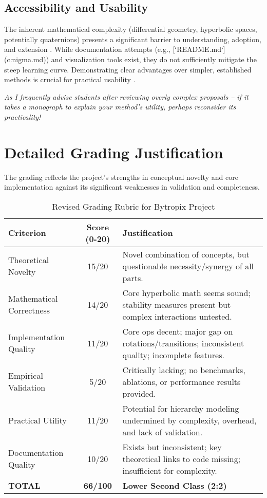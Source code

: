 \documentclass[11pt]{article}
\begin{document}
\subsection{Accessibility and Usability}

The inherent mathematical complexity (differential geometry, hyperbolic spaces, potentially quaternions) presents a significant barrier to understanding, adoption, and extension \cite{BronsteinEtAl2021}. While documentation attempts (e.g., [`README.md`](c:\Users\3nigma\source\repos\bytropix\README.md)) and visualization tools exist, they do not sufficiently mitigate the steep learning curve. Demonstrating clear advantages over simpler, established methods is crucial for practical usability \cite{MhammediEtAl2023}.

\textit{As I frequently advise students after reviewing overly complex proposals – if it takes a monograph to explain your method's utility, perhaps reconsider its practicality!}

\section{Detailed Grading Justification}

The grading reflects the project's strengths in conceptual novelty and core implementation against its significant weaknesses in validation and completeness.

\begin{table}[H]
\centering
\caption{Revised Grading Rubric for Bytropix Project}
\label{tab:grading} %
\begin{tabular}{@{}lcl@{}}
\toprule
\textbf{Criterion} & \textbf{Score (0-20)} & \textbf{Justification} \\ \midrule
Theoretical Novelty & 15/20 & Novel combination of concepts, but questionable necessity/synergy of all parts. \\
Mathematical Correctness & 14/20 & Core hyperbolic math seems sound; stability measures present but complex interactions untested. \\
Implementation Quality & 11/20 & Core ops decent; major gap on rotations/transitions; inconsistent quality; incomplete features. \\
Empirical Validation & 5/20 & Critically lacking; no benchmarks, ablations, or performance results provided. \\
Practical Utility & 11/20 & Potential for hierarchy modeling undermined by complexity, overhead, and lack of validation. \\
Documentation Quality & 10/20 & Exists but inconsistent; key theoretical links to code missing; insufficient for complexity. \\ \midrule
\textbf{TOTAL} & \textbf{66/100} & \textbf{Lower Second Class (2:2)} \\ \bottomrule
\end{tabular}
\end{table}
\end{document}
